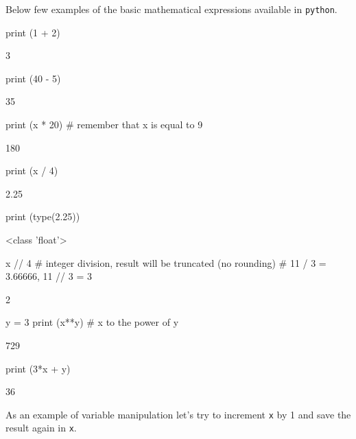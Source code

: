 Below few examples of the basic mathematical expressions available in \texttt{python}.

\begin{ipython}
print (1 + 2)	
\end{ipython}
\begin{ioutput}
3
\end{ioutput}

\begin{ipython}
print (40 - 5)	
\end{ipython}
\begin{ioutput}
35
\end{ioutput}

\begin{ipython}
print (x * 20) # remember that x is equal to 9
\end{ipython}
\begin{ioutput}
180	
\end{ioutput}

\begin{ipython}
print (x / 4)
\end{ipython}
\begin{ioutput}
2.25
\end{ioutput}

\begin{ipython}
print (type(2.25))
\end{ipython}
\begin{ioutput}
<class 'float'>	
\end{ioutput}

\begin{ipython}
x // 4 # integer division, result will be truncated (no rounding)
       # 11 / 3 = 3.66666, 11 // 3 = 3
\end{ipython}
\begin{ioutput}
2
\end{ioutput}

\begin{ipython}
y = 3
print (x**y) # x to the power of y 	
\end{ipython}
\begin{ioutput}
729
\end{ioutput}

\begin{ipython}
print (3*x + y)	
\end{ipython}
\begin{ioutput}
36	
\end{ioutput}

As an example of variable manipulation let's try to increment \texttt{x} by 1 and save the result again in \texttt{x}.

